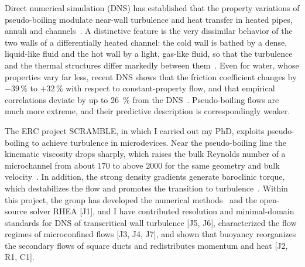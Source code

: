 \documentclass[11pt]{article}
\begin{document}
Direct numerical simulation (DNS) has established that the property variations of pseudo-boiling modulate near-wall turbulence and heat transfer in heated pipes, annuli and channels~\cite{Bae2005,Peeters2016,Nemati2016,Kawai2019,Guo2022,Wan2025}.
A distinctive feature is the very dissimilar behavior of the two walls of a differentially heated channel: the cold wall is bathed by a dense, liquid-like fluid and the hot wall by a light, gas-like fluid, so that the turbulence and the thermal structures differ markedly between them~\cite{Ma2018,Guo2022,ElMansy2025}. 
Even for water, whose properties vary far less, recent DNS shows that the friction coefficient changes by $-39\,\%$ to $+32\,\%$ with respect to constant-property flow, and that empirical correlations deviate by up to 26~\% from the
DNS~\cite{Modesti2026}. 
Pseudo-boiling flows are much more extreme, and their predictive description is correspondingly weaker.

The ERC project SCRAMBLE, in which I carried out my PhD, exploits pseudo-boiling to achieve turbulence in microdevices. Near the pseudo-boiling line the kinematic viscosity drops sharply, which raises the bulk Reynolds number of a microchannel from about $170$ to above $2000$ for the same geometry and bulk velocity~\cite{Hurtan2025}. In addition, the strong density gradients generate baroclinic torque, which destabilizes the flow and promotes the transition to turbulence~\cite{Bernades2023,Bernades2025}. Within this project, the group has developed the numerical methods~\cite{BernadesKEEP2023} and the open-source solver RHEA [J1], and I have contributed resolution and minimal-domain standards for DNS of transcritical wall turbulence [J5, J6], characterized the flow regimes of microconfined flows [J3, J4, J7], and shown that buoyancy reorganizes the secondary flows of square ducts and redistributes momentum and heat [J2, R1, C1].
\end{document}
